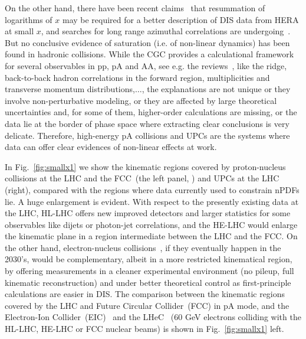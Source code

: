 \documentclass[../report.tex]{subfiles}
\begin{document}
On the other hand, there have been recent claims~\cite{Ball:2017otu,Abdolmaleki:2018jln} that resummation of logarithms of $x$ may be required for a better description of DIS data from HERA at small $x$, and searches for long range azimuthal correlations are undergoing~\cite{zeusichep2018}. 
But no conclusive evidence of saturation (i.e. of non-linear dynamics) has been found in hadronic collisions. While the CGC provides a calculational framework for several observables in pp, pA and AA, see e.g. the reviews~\cite{Albacete:2013tpa,Lappi:2015jka}, like the ridge, back-to-back hadron correlations in the forward region, multiplicities and transverse momentum distributions,$\dots$,  the explanations are not unique or they involve non-perturbative modeling, or they are affected by large theoretical uncertainties and, for some of them, higher-order calculations are missing, or the data lie at the border of phase space where extracting clear conclusions is very delicate. 
Therefore, high-energy pA collisions and UPCs are the systems where data can offer clear evidences of non-linear effects at work.

In Fig.~\ref{fig:smallx1} we show the kinematic regions covered by proton-nucleus collisions at the LHC and the FCC~(the left panel, \cite{Dainese:2016gch}) and UPCs at the LHC (right), compared with the regions where data currently used to constrain nPDFs lie.
A huge enlargement is evident. With respect to the presently existing data at the LHC, HL-LHC offers new improved detectors and larger statistics for some observables like dijets or photon-jet correlations, and the HE-LHC would enlarge the kinematic plane in a region intermediate between the LHC and the FCC. On the other hand, electron-nucleus collisions~\cite{AbelleiraFernandez:2012cc,Accardi:2012qut}, if they eventually happen in the 2030's, would be complementary, albeit in a more restricted kinematical region, by offering measurements in a cleaner experimental environment (no pileup, full kinematic reconstruction) and under better theoretical control as first-principle calculations are easier in DIS. 
The comparison between the kinematic regions covered by the LHC and Future Circular Collider~(FCC) in pA mode, and the Electron-Ion Collider~(EIC)~\cite{Accardi:2012qut} and the LHeC~\cite{AbelleiraFernandez:2012cc} (60 GeV electrons colliding with the HL-LHC, HE-LHC or FCC nuclear beams) is shown in Fig.~\ref{fig:smallx1} left.
\end{document}

